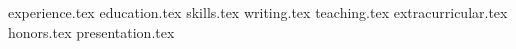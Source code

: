 \documentclass[11pt, a4paper]{awesome-cv}
\newcommand*{\sectiondir}{resume/}
\begin{document}
\makecvheader

{experience.tex}
{education.tex}
{skills.tex}
{writing.tex}
{teaching.tex}
{extracurricular.tex}
{honors.tex}
{presentation.tex}
\end{document}
